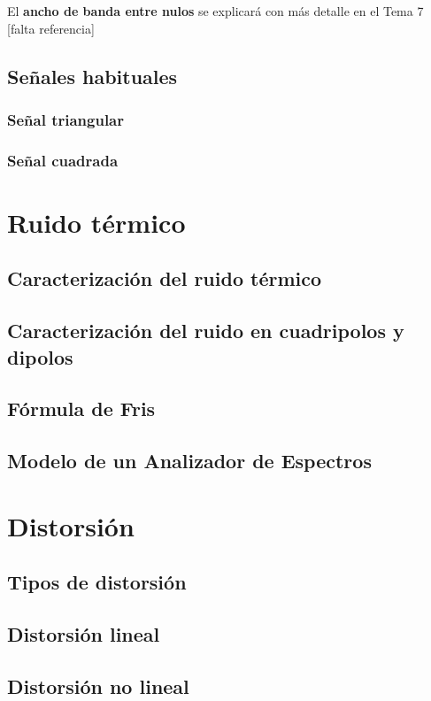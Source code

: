 \documentclass[a4paper]{book}
\begin{document}
El \textbf{ancho de banda entre nulos} se explicará con más detalle en el Tema 7 [falta referencia]

\section{Señales habituales}

\subsection{Señal triangular}

\subsection{Señal cuadrada}

\chapter{Ruido térmico}
\section{Caracterización del ruido térmico}
\section{Caracterización del ruido en cuadripolos y dipolos}
\section{Fórmula de Fris}
\section{Modelo de un Analizador de Espectros}

\chapter{Distorsión}
\section{Tipos de distorsión}
\section{Distorsión lineal}
\section{Distorsión no lineal}
\end{document}
